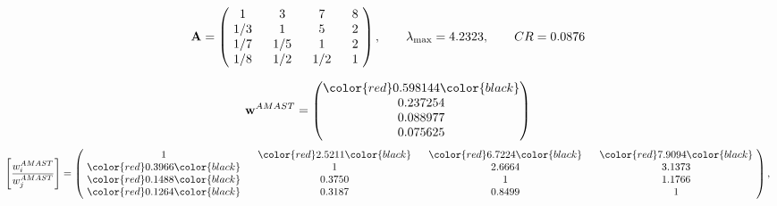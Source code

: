 \begin{example}
\begin{equation*}
\mathbf{A} =
\begin{pmatrix}
$\,\,$ 1 $\,\,$ & $\,\,$3$\,\,$ & $\,\,$7$\,\,$ & $\,\,$8 $\,\,$ \\
$\,\,$ 1/3$\,\,$ & $\,\,$ 1 $\,\,$ & $\,\,$5$\,\,$ & $\,\,$2 $\,\,$ \\
$\,\,$ 1/7$\,\,$ & $\,\,$ 1/5$\,\,$ & $\,\,$ 1 $\,\,$ & $\,\,$2 $\,\,$ \\
$\,\,$ 1/8$\,\,$ & $\,\,$ 1/2$\,\,$ & $\,\,$ 1/2$\,\,$ & $\,\,$ 1  $\,\,$ \\
\end{pmatrix},
\qquad
\lambda_{\max} =
4.2323,
\qquad
CR = 0.0876
\end{equation*}

\begin{equation*}
\mathbf{w}^{AMAST} =
\begin{pmatrix}
\color{red} 0.598144\color{black} \\
0.237254\\
0.088977\\
0.075625
\end{pmatrix}\end{equation*}
\begin{equation*}
\left[ \frac{{w}^{AMAST}_i}{{w}^{AMAST}_j} \right] =
\begin{pmatrix}
$\,\,$ 1 $\,\,$ & $\,\,$\color{red} 2.5211\color{black} $\,\,$ & $\,\,$\color{red} 6.7224\color{black} $\,\,$ & $\,\,$\color{red} 7.9094\color{black} $\,\,$ \\
$\,\,$\color{red} 0.3966\color{black} $\,\,$ & $\,\,$ 1 $\,\,$ & $\,\,$2.6664$\,\,$ & $\,\,$3.1373  $\,\,$ \\
$\,\,$\color{red} 0.1488\color{black} $\,\,$ & $\,\,$0.3750$\,\,$ & $\,\,$ 1 $\,\,$ & $\,\,$1.1766 $\,\,$ \\
$\,\,$\color{red} 0.1264\color{black} $\,\,$ & $\,\,$0.3187$\,\,$ & $\,\,$0.8499$\,\,$ & $\,\,$ 1  $\,\,$ \\
\end{pmatrix},
\end{equation*}


\end{example}
